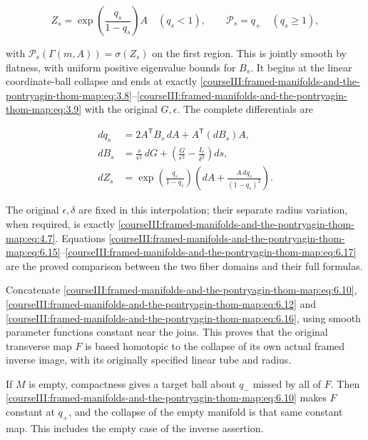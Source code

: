 \begin{equation}
Z_s=\exp\!\left(\frac{q_s}{1-q_s}\right)A
       \quad(q_s<1),\qquad \mathcal P_s=q_+\quad(q_s\geq1),
 \label{courseIII:framed-manifolds-and-the-pontryagin-thom-map:eq:6.16}
\end{equation}

with \(\mathcal P_s(\Gamma(m,A))=\sigma(Z_s)\) on the first region. This is jointly smooth by flatness, with uniform positive eigenvalue bounds for \(B_s\). It begins at the linear coordinate-ball collapse and ends at exactly \eqref{courseIII:framed-manifolds-and-the-pontryagin-thom-map:eq:3.8}--\eqref{courseIII:framed-manifolds-and-the-pontryagin-thom-map:eq:3.9} with the original \(G,\epsilon\). The complete differentials are

\begin{equation}
\begin{aligned}
 dq_s&=2A^{\mathsf T}B_s\,dA+A^{\mathsf T}(dB_s)A,\\
 dB_s&=\frac{s}{\epsilon^2}\,dG+
             \left(\frac{G}{\epsilon^2}
                         -\frac{I_r}{\delta^2}\right)ds,\\
 dZ_s&=\exp\!\left(\frac{q_s}{1-q_s}\right)
               \left(dA+\frac{A\,dq_s}{(1-q_s)^2}\right).
 \end{aligned}
 \label{courseIII:framed-manifolds-and-the-pontryagin-thom-map:eq:6.17}
\end{equation}

The original \(\epsilon,\delta\) are fixed in this interpolation; their separate radius variation, when required, is exactly \eqref{courseIII:framed-manifolds-and-the-pontryagin-thom-map:eq:4.7}. Equations \eqref{courseIII:framed-manifolds-and-the-pontryagin-thom-map:eq:6.15}--\eqref{courseIII:framed-manifolds-and-the-pontryagin-thom-map:eq:6.17} are the proved comparison between the two fiber domains and their full formulas.

Concatenate \eqref{courseIII:framed-manifolds-and-the-pontryagin-thom-map:eq:6.10}, \eqref{courseIII:framed-manifolds-and-the-pontryagin-thom-map:eq:6.12} and \eqref{courseIII:framed-manifolds-and-the-pontryagin-thom-map:eq:6.16}, using smooth parameter functions constant near the joins. This proves that the original transverse map \(F\) is based homotopic to the collapse of its own actual framed inverse image, with its originally specified linear tube and radius.

If \(M\) is empty, compactness gives a target ball about \(q_-\) missed by all of \(F\). Then \eqref{courseIII:framed-manifolds-and-the-pontryagin-thom-map:eq:6.10} makes \(F\) constant at \(q_+\), and the collapse of the empty manifold is that same constant map. This includes the empty case of the inverse assertion.

